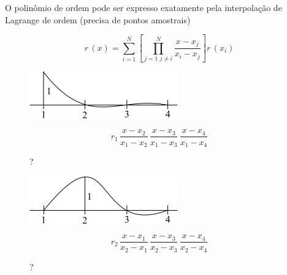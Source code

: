 \begin{enumerate}
O polinômio  de ordem  pode ser expresso exatamente pela interpolação de Lagrange de ordem  (precisa de  pontos amostrais)

\begin{equation}
 \label{cap2:sec6:eq6}
 r\,(x) =
 \sum_{i=1}^N \left[
  \prod_{
    j=1 \,\, j \neq i
  }^N
  \frac{x-x_j}{x_i-x_j}
 \right]
 r\,(x_i)
\end{equation}

\begin{example}

\begin{figure}[htb]
 \centering
 \begin{minipage}[c]{7cm}
    \includegraphics[scale=0.9]{capitulos/capitulo2/figuras/quadraturas_de_gauss2.png}
    \caption{?}
    \label{fig:quadraturas_de_gauss2}
 \end{minipage}\hspace*{1cm}
 \begin{minipage}[c]{6cm}
    \[
     r_1 \, \frac{x-x_2}{x_1-x_2} \, \frac{x-x_3}{x_1-x_3} \, \frac{x-x_4}{x_1-x_4}
    \]
 \end{minipage}
\end{figure}

\begin{figure}[htb]
 \centering
 \begin{minipage}[c]{7cm}
    \includegraphics[scale=0.9]{capitulos/capitulo2/figuras/quadraturas_de_gauss3.png}
    \caption{?}
    \label{fig:quadraturas_de_gauss3}
 \end{minipage}\hspace*{1cm}
 \begin{minipage}[c]{6cm}
    \[
     r_2 \, \frac{x-x_1}{x_2-x_1} \, \frac{x-x_3}{x_2-x_3} \, \frac{x-x_4}{x_2-x_4}
    \]
 \end{minipage}
\end{figure}


\end{example}
\end{enumerate}
